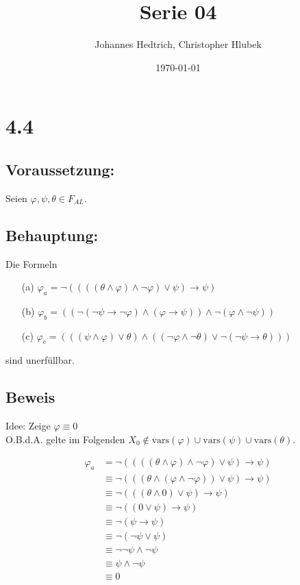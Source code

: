 \documentclass[12pt,a4paper]{scrartcl}
\title{Serie 04}
\author{Johannes Hedtrich, Christopher Hlubek}
\date{\today}
\begin{document}
\section*{4.4}
\subsection*{Voraussetzung:}

Seien $\varphi, \psi, \theta \in F_{AL}$.

\subsection*{Behauptung:}
Die Formeln
\begin{enumerate}
  \item[(a)] $\varphi_a = \neg((((\theta \wedge \varphi) \wedge \neg \varphi) \vee \psi) \rightarrow \psi)$
  \item[(b)] $\varphi_b = ((\neg (\neg \psi \rightarrow \neg \varphi) \wedge (\varphi \rightarrow \psi)) \wedge \neg(\varphi \wedge \neg \psi))$
  \item[(c)] $\varphi_c = (((\psi \wedge \varphi) \vee \theta) \wedge ((\neg \varphi \wedge \neg \theta) \vee \neg(\neg \psi \rightarrow \theta)))$
\end{enumerate}
sind unerfüllbar.

\subsection*{Beweis}

Idee: Zeige $\varphi \equiv 0$\\
O.B.d.A. gelte im Folgenden $X_0 \not\in \textrm{vars}(\varphi) \cup \textrm{vars}(\psi) \cup \textrm{vars}(\theta)$.

\setcounter{equation}{-1}
\begin{align}
  \varphi_a
    & =\neg ((((\theta \wedge \varphi) \wedge \neg \varphi) \vee \psi) \rightarrow \psi) \\
    & \equiv \neg(((\theta \wedge (\varphi \wedge \neg \varphi)) \vee \psi) \rightarrow \psi) \\
    & \equiv \neg(((\theta \wedge 0) \vee \psi) \rightarrow \psi) \\
    & \equiv \neg((0 \vee \psi) \rightarrow \psi) \\
    & \equiv \neg(\psi \rightarrow \psi) \\
    & \equiv \neg(\neg \psi \vee \psi) \\
    & \equiv \neg \neg \psi \wedge \neg \psi \\
    & \equiv \psi \wedge \neg \psi \\
    & \equiv 0
\end{align}
\end{document}

